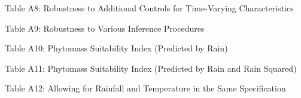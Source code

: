\documentclass[pdf,letterpaper,11pt]{article}
\begin{document}
\begin{table} [H]  \centering
  \begin{scriptsize}
\begin{threeparttable}
\caption*{Table A8: Robustness to Additional Controls for Time-Varying Characteristics}
 
   \end{threeparttable}
    \end{scriptsize}
\end{table}


\begin{table} [H]  \centering
 \begin{scriptsize}
\begin{threeparttable}
\caption*{Table A9: Robustness to Various Inference Procedures}
 
 
 
   \end{threeparttable}
    \end{scriptsize}
\end{table}


\begin{table} [H]  \centering
  \begin{scriptsize}
\begin{threeparttable}
\caption*{Table A10: Phytomass Suitability Index (Predicted by Rain)}
 
   \end{threeparttable}
    \end{scriptsize}
\end{table}


\begin{table} [H]  \centering
  \begin{scriptsize}
\begin{threeparttable}
\caption*{Table A11: Phytomass Suitability Index (Predicted by Rain and Rain Squared)}
 
   \end{threeparttable}
    \end{scriptsize}
\end{table}


 \begin{table}[H]  \centering
  \begin{scriptsize}
\begin{threeparttable}
\caption*{Table A12: Allowing for Rainfall and Temperature in the Same Specification}
 
   \end{threeparttable}
    \end{scriptsize}
\end{table}
\end{document}
